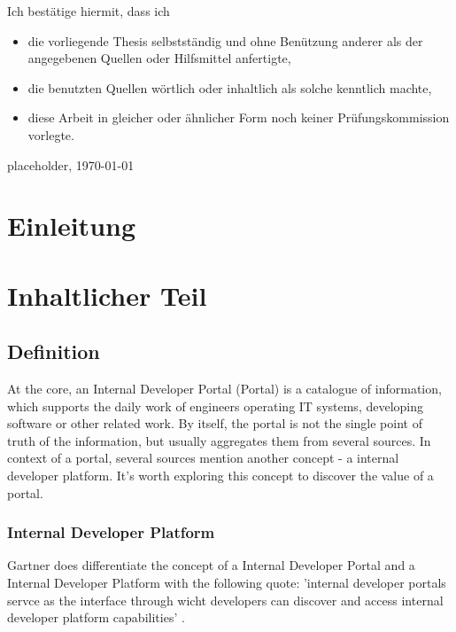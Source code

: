 \documentclass[a4paper,12pt]{article}
\begin{document}
    Ich bestätige hiermit, dass ich
    \begin{itemize}
        \item die vorliegende Thesis selbstständig und ohne Benützung anderer als der angegebenen Quellen oder Hilfsmittel anfertigte,
        \item die benutzten Quellen wörtlich oder inhaltlich als solche kenntlich machte,
        \item diese Arbeit in gleicher oder ähnlicher Form noch keiner Prüfungskommission vorlegte.
    \end{itemize}
    placeholder, \today\newline


    \section{Einleitung}


    \section{Inhaltlicher Teil}

    \subsection{Definition}
    At the core, an Internal Developer Portal (Portal) is a catalogue of information, which supports the daily work of
    engineers
    operating IT systems, developing software or other related work.
    By itself, the portal is not the single point of truth of the information, but usually aggregates them from several sources.
    In context of a portal, several sources mention another concept - a internal developer platform.
    It's worth exploring this concept to discover the value of
    a portal.

    \subsubsection{Internal Developer Platform}
    Gartner does differentiate the concept of a Internal Developer Portal and a Internal Developer Platform with the
    following quote: 'internal developer portals servce as the interface through wicht developers can discover and
    access internal developer platform capabilities' \cite{gartner}.
\end{document}

